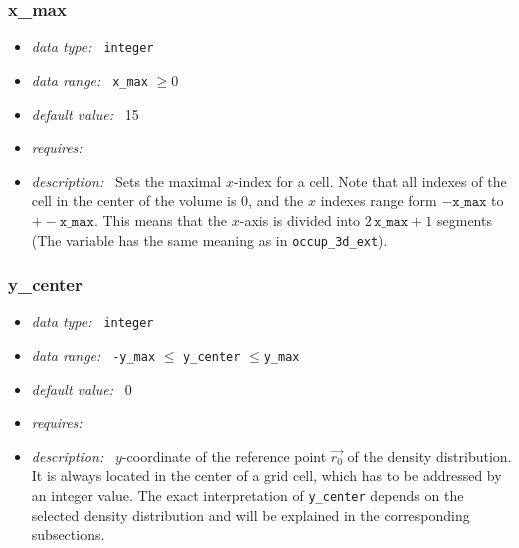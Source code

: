 \documentclass[a4paper,10pt]{article}
\begin{document}
\begin{appendix}
\subsubsection{x\_max}
\label{hydoptnl:xmax}
\begin{itemize}
 \item \textit{data type:~} \texttt{integer}
 \item \textit{data range:~} \texttt{x\_max} $\ge0$
 \item \textit{default value:~} 15
 \item \textit{requires:~} 
 \item \textit{description:~} Sets the maximal $x$-index for a cell. Note that
  all indexes of the cell in the center of the volume is 0, and the  $x$ 
  indexes range form $-\mathtt{x\_max}$ to $+-\mathtt{x\_max}$. This means that 
  the $x$-axis is divided into $2\, \mathtt{x\_max} +1$ segments (The variable 
  has the same meaning as in \texttt{occup\_3d\_ext}).
\end{itemize}

\subsubsection{y\_center}
\label{hydoptnl:ycenter}
\begin{itemize}
 \item \textit{data type:~} \texttt{integer}
 \item \textit{data range:~} \texttt{-y\_max} $ \leq$ \texttt{y\_center} 
  $\leq $\texttt{y\_max} 
 \item \textit{default value:~} 0
 \item \textit{requires:~} 
 \item \textit{description:~} $y$-coordinate of the reference point $\vec{r_0}$
  of the density distribution.  It is always located in the center of a grid 
  cell, which has to be addressed by an integer value. 
  The exact interpretation of \texttt{y\_center} depends on the selected 
  density distribution and will be 
  explained in the corresponding subsections.
\end{itemize}



\end{appendix}
\end{document}

